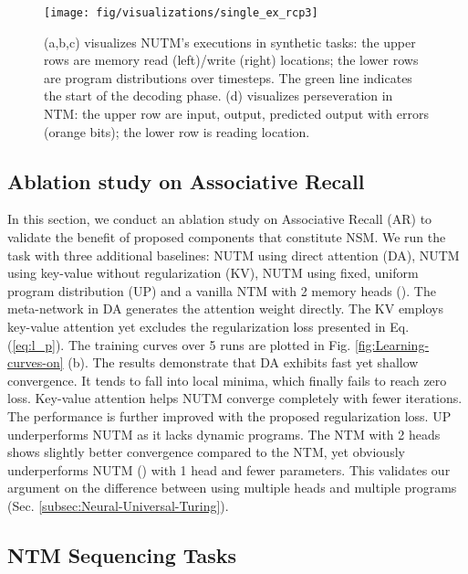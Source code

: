 \documentclass[english]{article}
\begin{document}
\begin{figure}
\begin{centering}
\texttt{[image: fig/visualizations/single\_ex\_rcp3]}
\par\end{centering}
\caption{(a,b,c) visualizes NUTM's executions in synthetic tasks: the upper
rows are memory read (left)/write (right) locations; the lower rows
are program distributions over timesteps. The green line indicates
the start of the decoding phase. (d) visualizes perseveration in NTM:
the upper row are input, output, predicted output with errors (orange
bits); the lower row is reading location. \label{fig:Memory-read-(a,c,d)/write}}
\end{figure}

\subsection{Ablation study on Associative Recall}

In this section, we conduct an ablation study on Associative Recall
(AR) to validate the benefit of proposed components that constitute
NSM. We run the task with three additional baselines: NUTM using direct
attention (DA), NUTM using key-value without regularization (KV),
NUTM using fixed, uniform program distribution (UP) and a vanilla
NTM with 2 memory heads (). The meta-network 
in DA generates the attention weight  directly. The KV
employs key-value attention yet excludes the regularization loss presented
in Eq. (\ref{eq:l_p}). The training curves over 5 runs are plotted
in Fig. \ref{fig:Learning-curves-on} (b). The results demonstrate
that DA exhibits fast yet shallow convergence. It tends to fall into
local minima, which finally fails to reach zero loss. Key-value attention
helps NUTM converge completely with fewer iterations. The performance
is further improved with the proposed regularization loss. UP underperforms
NUTM as it lacks dynamic programs. The NTM with 2 heads shows slightly
better convergence compared to the NTM, yet obviously underperforms
NUTM () with 1 head and fewer parameters. This validates our
argument on the difference between using multiple heads and multiple
programs (Sec. \ref{subsec:Neural-Universal-Turing}). 


\subsection{NTM Sequencing Tasks}
\end{document}
